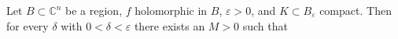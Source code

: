 Let $B \subset \mathbb{C}^n$ be a region, $f$ holomorphic in $B$, $\varepsilon > 0$, and $K \subset B_\varepsilon$ compact. Then for every $\delta$ with $0 < \delta < \varepsilon$ there exists an $M > 0$ such that
